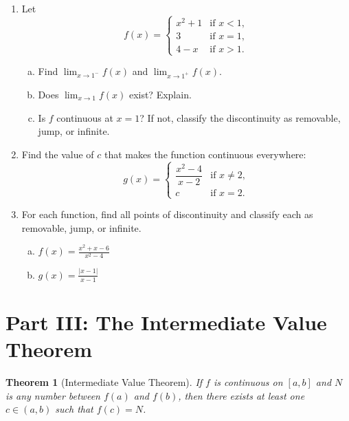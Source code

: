 \documentclass[11pt]{article}
\newtheorem{theorem}{Theorem}
\begin{document}
\begin{enumerate}[resume]
\item Let
\[
  f(x) = \begin{cases}
    x^2 + 1 & \text{if } x < 1, \\[4pt]
    3       & \text{if } x = 1, \\[4pt]
    4 - x   & \text{if } x > 1.
  \end{cases}
\]
\begin{enumerate}[(a)]
  \item Find $\displaystyle \lim_{x \to 1^-} f(x)$ and $\displaystyle \lim_{x \to 1^+} f(x)$.
  \item Does $\displaystyle \lim_{x \to 1} f(x)$ exist? Explain.
  \item Is $f$ continuous at $x = 1$? If not, classify the discontinuity as removable, jump, or infinite.
\end{enumerate}

\item Find the value of $c$ that makes the function continuous everywhere:
\[
  g(x) = \begin{cases}
    \dfrac{x^2 - 4}{x - 2} & \text{if } x \neq 2, \\[8pt]
    c & \text{if } x = 2.
  \end{cases}
\]

\item For each function, find all points of discontinuity and classify each as removable, jump, or infinite.
\begin{enumerate}[(a)]
  \item $\displaystyle f(x) = \frac{x^2 + x - 6}{x^2 - 4}$

  \item $\displaystyle g(x) = \frac{|x - 1|}{x - 1}$
\end{enumerate}
\end{enumerate}

\section*{Part III: The Intermediate Value Theorem}

\begin{theorem}[Intermediate Value Theorem]
If $f$ is continuous on $[a, b]$ and $N$ is any number between $f(a)$ and $f(b)$, then there exists at least one $c \in (a, b)$ such that $f(c) = N$.
\end{theorem}
\end{document}

